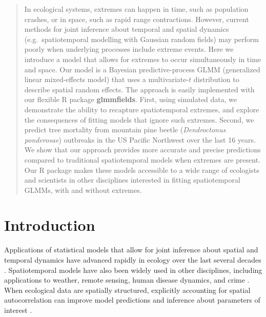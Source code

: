 \documentclass[12pt,english]{article}
\begin{document}
\begin{spacing}{1.8}
\linenumbers




\begin{abstract}

In ecological systems, extremes can happen
in time, such as population crashes,
or in space, such as rapid range contractions.
However, current methods for
joint inference about temporal and spatial dynamics
(e.g.\ spatiotemporal modelling with Gaussian random fields)
may perform poorly when
underlying processes include extreme events.
Here we introduce a model that allows for extremes
to occur simultaneously in time and space.
Our model is a Bayesian predictive-process GLMM
(generalized linear mixed-effects model)
that uses a multivariate-$t$ distribution to describe spatial random effects.
The approach is easily implemented with
our flexible R package \textbf{glmmfields}.
First, using simulated data,
we demonstrate the ability to recapture spatiotemporal extremes,
and explore the consequences of fitting models that ignore such extremes.
Second, we predict
tree mortality from mountain pine beetle (\emph{Dendroctonus ponderosae})
outbreaks in the US Pacific Northwest over the last 16 years.
We show that our approach provides
more accurate and precise predictions
compared to traditional spatiotemporal models
when extremes are present.
Our R package makes these models
accessible to a wide range of ecologists
and scientists in other disciplines interested in
fitting spatiotemporal GLMMs, with and without extremes.
\end{abstract}

%
%

\section{Introduction}

Applications of statistical models that allow for joint inference about spatial
and temporal dynamics have advanced rapidly in ecology over the last several
decades \citep[e.g.][]{bascompte1995, latimer2009, conn2015}. Spatiotemporal
models have also been widely used in other disciplines, including applications
to weather, remote sensing, human disease dynamics, and crime
\citep{cressie2011}. When ecological data are spatially structured, explicitly
accounting for spatial autocorrelation can improve model predictions and
inference about parameters of interest \citep[e.g.][]{shelton2014, thorson2015, verhoef2018}.


\end{spacing}
\end{document}
